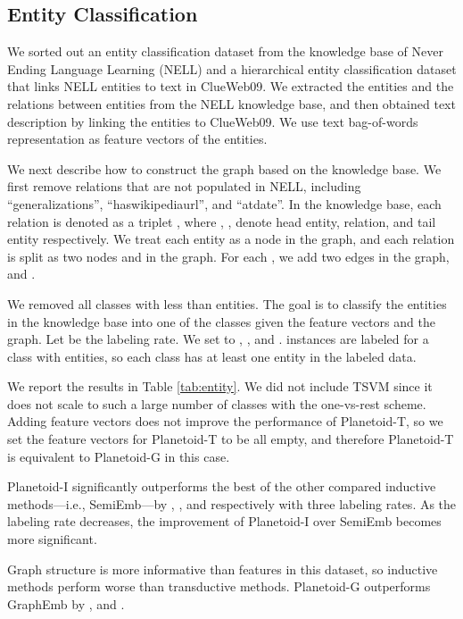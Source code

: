 \subsection{Entity Classification}

We sorted out an entity classification dataset from the knowledge base of Never Ending Language Learning (NELL)
\cite{carlson2010toward} and a hierarchical entity classification dataset \cite{dalvi2014hierarchical}
that links NELL entities to text in ClueWeb09. We extracted the entities and the relations between entities from the NELL knowledge base, and then obtained text description by linking the entities to ClueWeb09. We use text bag-of-words representation as feature vectors of the entities.

We next describe how to construct the graph based on the knowledge base. We first remove relations that are not populated in NELL, including ``generalizations'', ``haswikipediaurl'', and ``atdate''. In the knowledge base, each relation is denoted as a triplet , where , ,  denote head entity, relation, and tail entity respectively. We treat each entity  as a node in the graph, and each relation  is split as two nodes  and  in the graph. For each , we add two edges in the graph,  and .

We removed all classes with less than  entities. The goal is to classify the entities in the knowledge base into one of the  classes given the feature vectors and the graph. Let  be the labeling rate. We set  to , , and .  instances are labeled for a class with  entities, so each class has at least one entity in the labeled data.

We report the results in Table \ref{tab:entity}. We did not include TSVM since it does not scale to such a large number of classes with the one-vs-rest scheme. Adding feature vectors does not improve the performance of Planetoid-T, so we set the feature vectors for Planetoid-T to be all empty, and therefore Planetoid-T is equivalent to Planetoid-G in this case.

Planetoid-I significantly outperforms the best of the other compared inductive methods---i.e., SemiEmb---by , , and  respectively with three labeling rates. As the labeling rate decreases, the improvement of Planetoid-I over SemiEmb becomes more significant.

Graph structure is more informative than features in this dataset, so inductive methods perform worse than transductive methods. Planetoid-G outperforms GraphEmb by ,  and .





